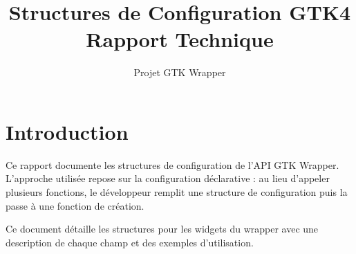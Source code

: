 \documentclass[12pt,a4paper]{article}
\title{Structures de Configuration GTK4 \\ Rapport Technique}
\author{Projet GTK Wrapper}
\begin{document}


\maketitle

\tableofcontents

\newpage

\section{Introduction}
Ce rapport documente les structures de configuration de l'API GTK Wrapper. L'approche utilisée repose sur la configuration déclarative : au lieu d'appeler plusieurs fonctions, le développeur remplit une structure de configuration puis la passe à une fonction de création.

Ce document détaille les structures pour les widgets du wrapper avec une description de chaque champ et des exemples d'utilisation.

\newpage












\end{document}
